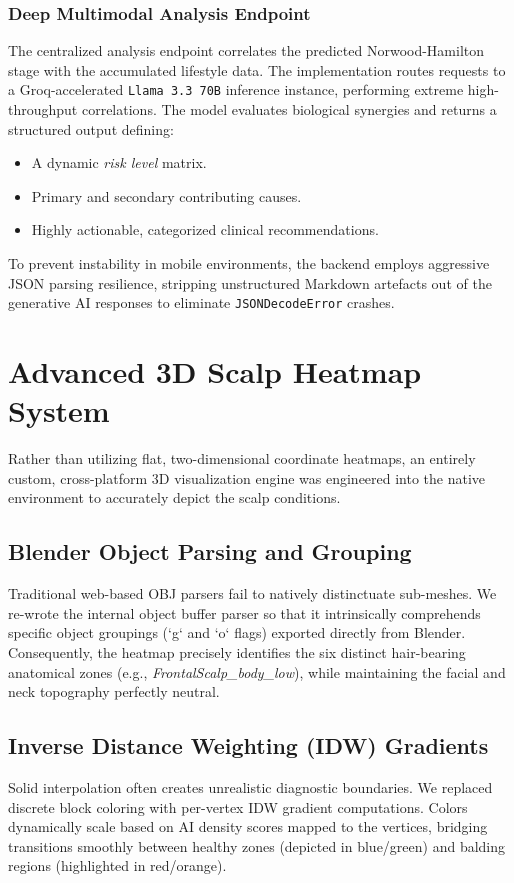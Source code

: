 \documentclass[12pt, a4paper]{article}
\begin{document}
\subsubsection{Deep Multimodal Analysis Endpoint}
The centralized analysis endpoint correlates the predicted Norwood-Hamilton stage with the accumulated lifestyle data. The implementation routes requests to a Groq-accelerated \texttt{Llama 3.3 70B} inference instance, performing extreme high-throughput correlations. The model evaluates biological synergies and returns a structured output defining:
\begin{itemize}
    \item A dynamic \textit{risk level} matrix.
    \item Primary and secondary contributing causes.
    \item Highly actionable, categorized clinical recommendations.
\end{itemize}

To prevent instability in mobile environments, the backend employs aggressive JSON parsing resilience, stripping unstructured Markdown artefacts out of the generative AI responses to eliminate \texttt{JSONDecodeError} crashes.

\section{Advanced 3D Scalp Heatmap System}

Rather than utilizing flat, two-dimensional coordinate heatmaps, an entirely custom, cross-platform 3D visualization engine was engineered into the native environment to accurately depict the scalp conditions.

\subsection{Blender Object Parsing and Grouping}
Traditional web-based OBJ parsers fail to natively distinctuate sub-meshes. We re-wrote the internal object buffer parser so that it intrinsically comprehends specific object groupings (`g` and `o` flags) exported directly from Blender. Consequently, the heatmap precisely identifies the six distinct hair-bearing anatomical zones (e.g., \textit{FrontalScalp\_body\_low}), while maintaining the facial and neck topography perfectly neutral. 

\subsection{Inverse Distance Weighting (IDW) Gradients}
Solid interpolation often creates unrealistic diagnostic boundaries. We replaced discrete block coloring with per-vertex IDW gradient computations. Colors dynamically scale based on AI density scores mapped to the vertices, bridging transitions smoothly between healthy zones (depicted in blue/green) and balding regions (highlighted in red/orange).
\end{document}
